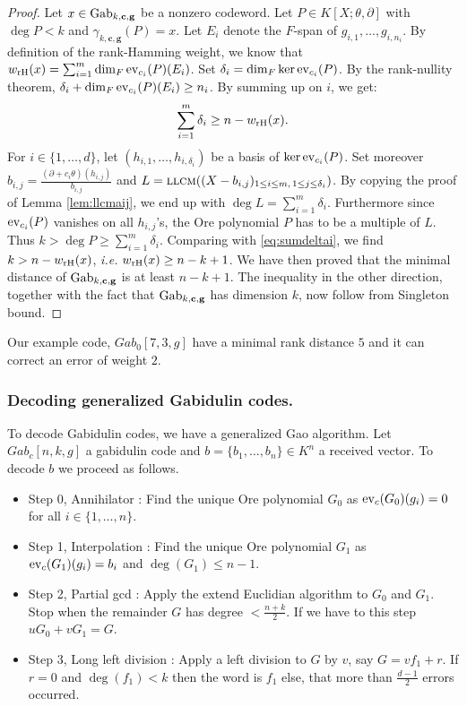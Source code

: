 \documentclass[a4paper]{llncs}
\newcommand{\ev}[1]{\textrm{\rm ev}_{#1}}
\newcommand{\llcm}{\textsc{llcm}}
\newcommand{\bc}{\textbf{c}}
\newcommand{\bg}{\textbf{g}}
\newcommand{\Gab}{\textrm{\rm Gab}}
\newcommand{\wrH}{w_{\textrm{\rm rH}}}
\begin{document}
\begin{proof}
Let $x \in \Gab_{k,\bc,\bg}$ be a nonzero codeword. Let $P \in 
K[X;\theta,\partial]$ with $\deg P < k$ and $\gamma_{k,\bc,\bg}(P) = x$.
Let $E_i$ denote the $F$-span of $g_{i,1}, \ldots, g_{i,n_i}$. By
definition of the rank-Hamming weight, we know that
$\wrH(x) = \sum_{i=1}^m \dim_F \ev{c_i}(P)(E_i)$.
Set $\delta_i = \dim_F \ker \ev{c_i}(P)$. By the rank-nullity
theorem, $\delta_i + \dim_F \ev{c_i}(P)(E_i) \geq n_i$. By summing
up on $i$, we get:
\begin{equation}
\label{eq:sumdeltai}
\sum_{i=1}^m \delta_i \geq n - \wrH(x).
\end{equation}
For $i \in \{1,\ldots,d\}$, let $(h_{i,1}, \ldots, h_{i,\delta_i})$
be a basis of $\ker \ev{c_i}(P)$. 
Set moreover $b_{i,j} = \frac{(\partial + c_i\theta)(h_{i,j})}{b_{i,j}}$
and $L = \llcm((X - b_{i,j})_{1 \leq i \leq m, \, 1 \leq j \leq \delta_i})$.
By copying the proof of Lemma \ref{lem:llcmaij}, we end up with
$\deg L = \sum_{i=1}^m \delta_i$. Furthermore since $\ev{c_i}(P)$
vanishes on all $h_{i,j}$'s, the Ore polynomial $P$ has to be a 
multiple of $L$. Thus $k > \deg P \geq \sum_{i=1}^m \delta_i$.
Comparing with \eqref{eq:sumdeltai}, we find $k > n - \wrH(x)$,
\emph{i.e.} $\wrH(x) \geq n - k + 1$.
We have then proved that the minimal distance of $\Gab_{k,\bc,\bg}$
is at least $n - k + 1$.
The inequality in the other direction, together with the fact that
$\Gab_{k,\bc,\bg}$ has dimension $k$, now follow from Singleton bound.
\end{proof}

\begin{example}
Our example code, $Gab_0[7,3,g]$ have a minimal rank distance $5$ and it can correct an error of weight $2$. 
\end{example}

\subsubsection*{Decoding generalized Gabidulin codes.}

To decode Gabidulin codes, we have a generalized Gao algorithm. Let $Gab_c[n,k,g]$ a gabidulin code and $b = \{b_1, \dots, b_n\} \in K^n$ a received vector. To decode $b$ we proceed as follows.

\begin{itemize}
\item Step 0, Annihilator : Find the unique Ore polynomial $G_0$ as $\ev{c}(G_0)(g_i) = 0$ for all $i \in \{1, \dots, n\}$.
\item Step 1, Interpolation : Find the unique Ore polynomial $G_1$ as $\ev{c}(G_1)(g_i) = b_i$ and $\deg(G_1) \leqslant n-1$.
\item Step 2, Partial gcd : Apply the extend Euclidian algorithm to $G_0$ and $G_1$. Stop when the remainder $G$ has degree $< \frac{n+k}{2}$. If we have to this step $uG_0 + vG_1 = G$.
\item Step 3, Long left division : Apply a left division to $G$ by $v$, say $G = vf_1 + r$. If $r =0$ and $\deg(f_1) < k$ then the word is $f_1$ else, that more than $\frac{d-1}{2}$ errors occurred. 
\end{itemize}
\end{document}
